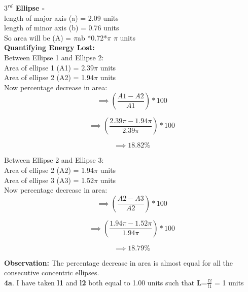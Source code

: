 \documentclass[11pt]{scrartcl} %
\begin{document}
\textbf{$3^{rd}$ Ellipse - }\\
length of major axis (a) = 2.09 units\\
length of minor axis (b) = 0.76 units\\

So area will be (A) = $\pi$ab *0.72*$\pi$ $\pi$ units\\

\textbf{Quantifying Energy Lost:}\\
Between Ellipse 1 and Ellipse 2:\\

Area of ellipse 1 (A1) = 2.39$\pi$ units\\
Area of ellipse 2 (A2) = 1.94$\pi$ units\\

Now percentage decrease in area:
\begin{equation*}
\implies (\frac{A1-A2}{A1})*100
\end{equation*}

\begin{equation*}
\implies (\frac{2.39\pi-1.94\pi}{2.39\pi})*100
\end{equation*}

\begin{equation*}
\implies 18.82 \%
\end{equation*}

Between Ellipse 2 and Ellipse 3:\\

Area of ellipse 2 (A2) = 1.94$\pi$ units\\
Area of ellipse 3 (A3) = 1.52$\pi$ units\\

Now percentage decrease in area:
\begin{equation*}
\implies (\frac{A2-A3}{A2})*100
\end{equation*}

\begin{equation*}
\implies (\frac{1.94\pi-1.52\pi}{1.94\pi})*100
\end{equation*}

\begin{equation*}
\implies 18.79 \%
\end{equation*}

\textbf{Observation:}
The percentage decrease in area is almost equal for all the consecutive concentric ellipses.\\

\textbf{4a}.
I have taken \textbf{l1} and \textbf{l2} both equal to 1.00 units such that \textbf{L}=$\frac{l2}{l1}$ = 1 units\\
\end{document}
